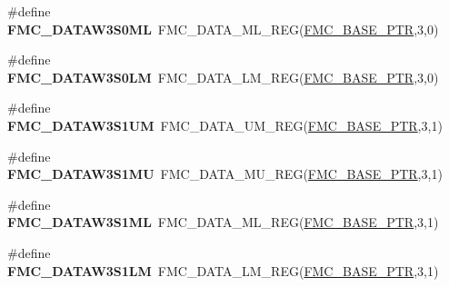 \begin{DoxyCompactItemize}
\item 
\hypertarget{group___f_m_c___register___accessor___macros_gafb11ede7d087593e5652b0d00f3094d7}{}\#define {\bfseries F\+M\+C\+\_\+\+D\+A\+T\+A\+W3\+S0\+M\+L}~F\+M\+C\+\_\+\+D\+A\+T\+A\+\_\+\+M\+L\+\_\+\+R\+E\+G(\hyperlink{group___f_m_c___peripheral_ga0a740437b573e32e6b932bf729485fd9}{F\+M\+C\+\_\+\+B\+A\+S\+E\+\_\+\+P\+T\+R},3,0)\label{group___f_m_c___register___accessor___macros_gafb11ede7d087593e5652b0d00f3094d7}

\item 
\hypertarget{group___f_m_c___register___accessor___macros_ga4cde25337db64075580001f9d5387f40}{}\#define {\bfseries F\+M\+C\+\_\+\+D\+A\+T\+A\+W3\+S0\+L\+M}~F\+M\+C\+\_\+\+D\+A\+T\+A\+\_\+\+L\+M\+\_\+\+R\+E\+G(\hyperlink{group___f_m_c___peripheral_ga0a740437b573e32e6b932bf729485fd9}{F\+M\+C\+\_\+\+B\+A\+S\+E\+\_\+\+P\+T\+R},3,0)\label{group___f_m_c___register___accessor___macros_ga4cde25337db64075580001f9d5387f40}

\item 
\hypertarget{group___f_m_c___register___accessor___macros_ga78ae26a4d03828276a8c9c54f9f3205f}{}\#define {\bfseries F\+M\+C\+\_\+\+D\+A\+T\+A\+W3\+S1\+U\+M}~F\+M\+C\+\_\+\+D\+A\+T\+A\+\_\+\+U\+M\+\_\+\+R\+E\+G(\hyperlink{group___f_m_c___peripheral_ga0a740437b573e32e6b932bf729485fd9}{F\+M\+C\+\_\+\+B\+A\+S\+E\+\_\+\+P\+T\+R},3,1)\label{group___f_m_c___register___accessor___macros_ga78ae26a4d03828276a8c9c54f9f3205f}

\item 
\hypertarget{group___f_m_c___register___accessor___macros_ga3ae7200dc3627f1f5b3b27922a1a53ab}{}\#define {\bfseries F\+M\+C\+\_\+\+D\+A\+T\+A\+W3\+S1\+M\+U}~F\+M\+C\+\_\+\+D\+A\+T\+A\+\_\+\+M\+U\+\_\+\+R\+E\+G(\hyperlink{group___f_m_c___peripheral_ga0a740437b573e32e6b932bf729485fd9}{F\+M\+C\+\_\+\+B\+A\+S\+E\+\_\+\+P\+T\+R},3,1)\label{group___f_m_c___register___accessor___macros_ga3ae7200dc3627f1f5b3b27922a1a53ab}

\item 
\hypertarget{group___f_m_c___register___accessor___macros_ga65d87d5d8bb9a5059d30de4c490682df}{}\#define {\bfseries F\+M\+C\+\_\+\+D\+A\+T\+A\+W3\+S1\+M\+L}~F\+M\+C\+\_\+\+D\+A\+T\+A\+\_\+\+M\+L\+\_\+\+R\+E\+G(\hyperlink{group___f_m_c___peripheral_ga0a740437b573e32e6b932bf729485fd9}{F\+M\+C\+\_\+\+B\+A\+S\+E\+\_\+\+P\+T\+R},3,1)\label{group___f_m_c___register___accessor___macros_ga65d87d5d8bb9a5059d30de4c490682df}

\item 
\hypertarget{group___f_m_c___register___accessor___macros_ga9c6e9675dbe0cb115dfbe53b10b3f931}{}\#define {\bfseries F\+M\+C\+\_\+\+D\+A\+T\+A\+W3\+S1\+L\+M}~F\+M\+C\+\_\+\+D\+A\+T\+A\+\_\+\+L\+M\+\_\+\+R\+E\+G(\hyperlink{group___f_m_c___peripheral_ga0a740437b573e32e6b932bf729485fd9}{F\+M\+C\+\_\+\+B\+A\+S\+E\+\_\+\+P\+T\+R},3,1)\label{group___f_m_c___register___accessor___macros_ga9c6e9675dbe0cb115dfbe53b10b3f931}


\end{DoxyCompactItemize}

